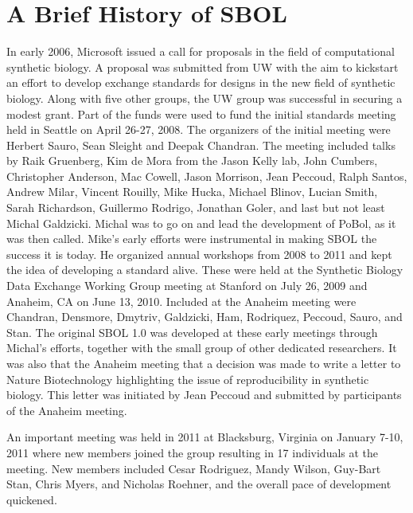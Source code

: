 \section{A Brief History of SBOL}

In early 2006, Microsoft issued a call for proposals in the field of computational synthetic biology. A proposal was submitted from UW with the aim to kickstart an effort to develop exchange standards for designs in the new field of synthetic biology. Along with five other groups, the UW group was successful in securing a modest grant. 
Part of the funds were used to fund the initial standards meeting held in Seattle on April 26-27, 2008. 
The organizers of the initial meeting were Herbert Sauro, Sean Sleight and Deepak Chandran. 
The meeting included talks by Raik Gruenberg,  Kim de Mora from the Jason Kelly lab, John Cumbers,  Christopher Anderson, Mac Cowell, Jason Morrison, Jean Peccoud, Ralph Santos, Andrew Milar, Vincent Rouilly, Mike Hucka, Michael Blinov, Lucian Smith, Sarah Richardson, Guillermo Rodrigo, Jonathan Goler, and last but not least Michal Galdzicki. 
Michal was to go on and lead the development of PoBol, as it was then called. Mike's early efforts were instrumental in making SBOL the success it is today. He organized annual workshops from 2008 to 2011 and kept the idea of developing a standard alive. 
These were held at the Synthetic Biology Data Exchange Working Group meeting at Stanford on July 26, 2009 and Anaheim, CA on June 13, 2010. 
Included at the Anaheim meeting were Chandran, Densmore, Dmytriv, Galdzicki, Ham, Rodriquez, Peccoud, Sauro, and Stan. 
The original SBOL 1.0 was developed at these early meetings through Michal's efforts, together with the small group of other dedicated researchers. 
It was also that the Anaheim meeting that a decision was made to write a letter to Nature Biotechnology highlighting the issue of reproducibility in synthetic biology. This letter was initiated by Jean Peccoud and submitted by participants of the Anaheim meeting. 

An important meeting was held in 2011 at Blacksburg, Virginia on January 7-10, 2011 where new members joined the group resulting in 17 individuals at the meeting. New members included Cesar Rodriguez, Mandy Wilson, Guy-Bart Stan, Chris Myers, and Nicholas Roehner, and the overall pace of development quickened. 

